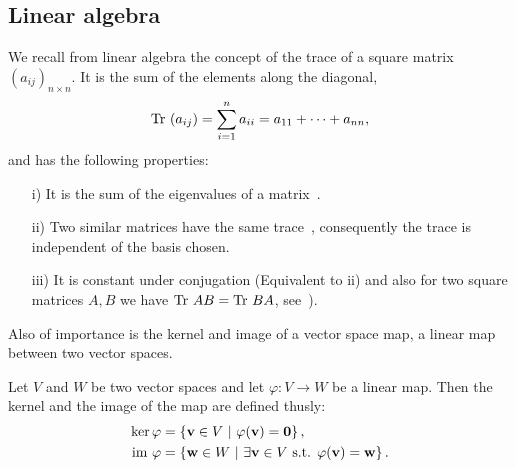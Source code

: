 \subsection{Linear algebra}

	
		We recall from linear algebra the concept of the trace of a square matrix $(a_{ij})_{n \times n}$. It is the sum of the elements along the diagonal,
		\begin{align*}
			\text{Tr }(a_{ij})= \sum_{i=1}^{n} a_{ii} = a_{11} + \dots + a_{nn},
		\end{align*}
		and has the following properties:
		\begin{proposition}\label{prop:trace}
			\begin{enumerate}
				\item[i)] It is the sum of the eigenvalues of a matrix~\cite[Cor.8.6.1.]{Nicholson}.
				\item[ii)] Two similar matrices have the same trace~\cite[Thm.5.5.1.]{Nicholson}, consequently the trace is independent of the basis chosen.
				\item[iii)] It is constant under conjugation (Equivalent to ii) and also for two square matrices $A,B$ we have $\text{Tr } AB = \text{Tr } BA$, see~\cite[Ex.2.3.30.]{Nicholson}).
			\end{enumerate}
		\end{proposition}


	Also of importance is the kernel and image of a vector space map, a linear map between two vector spaces. %
		
	\begin{definition}\label{def:kernelimage}
		Let $V$ and $W$ be two vector spaces and let $\varphi: V \rightarrow W$ be a linear map. Then the kernel and the image of the map are defined thusly:
		\begin{align*}
			 \ker \varphi &= \left\lbrace \mathbf{v} \in V \ \middle\vert \ \varphi(\mathbf{v}) = \mathbf{0} \right\rbrace, \\  \text{im } \varphi &= \left\lbrace \mathbf{w} \in W \ \middle\vert \ \exists \mathbf{v} \in V \text{ s.t. } \varphi(\mathbf{v}) = \mathbf{w} \right\rbrace.
		\end{align*}
	\end{definition}
	

